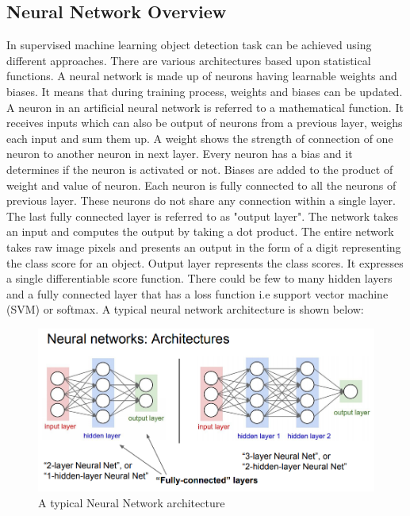 \documentclass[11pt]{article}
\begin{document}

\subsection{Neural Network Overview}
In supervised machine learning object detection task can be achieved using different approaches. There are various architectures based upon statistical functions. A neural network is made up of neurons having learnable weights and biases. It means that during training process, weights and biases can be updated. A neuron in an artificial neural network is referred to a mathematical function. It receives inputs which can also be output of neurons from a previous layer, weighs each input and sum them up. A weight shows the strength of connection of one neuron to another neuron in next layer. Every neuron has a bias and it determines if the neuron is activated or not. Biases are added to the product of weight and value of neuron. Each neuron is fully connected to all the neurons of previous layer. These neurons do not share any connection within a single layer. The last fully connected layer is referred to as "output layer". The network takes an input and computes the output by taking a dot product. The entire network takes raw image pixels and presents an output in the form of a digit representing the class score for an object. Output layer represents the class scores. It expresses a single differentiable score function. There could be few to many hidden layers and a fully connected layer that has a loss function i.e support vector machine (SVM) or softmax. A typical neural network architecture is shown below:

\begin{figure}[H]
	\includegraphics[width=\linewidth]{files/NN.jpeg}
	\caption{A typical Neural Network architecture}
	\label{fig: Neural Network architecture}
\end{figure}
\end{document}
